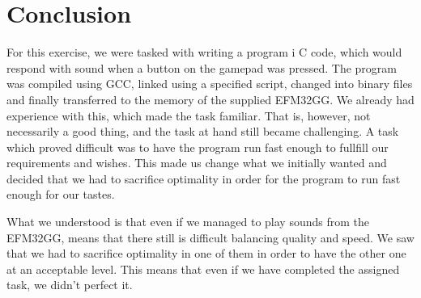 \chapter{Conclusion}

For this exercise, we were tasked with writing a program i C code, which would
respond with sound when a button on the gamepad was pressed. The program was
compiled using GCC, linked using a specified script, changed into binary files
and finally transferred to the memory of the supplied EFM32GG. We already had
experience with this, which made the task familiar. That is, however, not
necessarily a good thing, and the task at hand still became challenging. A task
which proved difficult was to have the program run fast enough to fullfill our
requirements and wishes. This made us change what we initially wanted and
decided that we had to sacrifice optimality in order for the program to run fast
enough for our tastes.

What we understood is that even if we managed to play sounds from the EFM32GG,
means that there still is difficult balancing quality and speed. We saw that we
had to sacrifice optimality in one of them in order to have the other one at an
acceptable level. This means that even if we have completed the assigned task,
we didn't perfect it.
